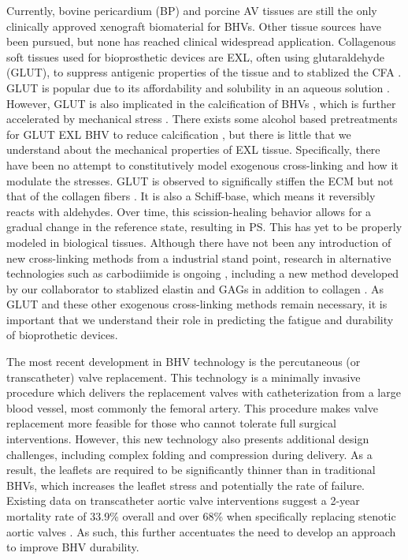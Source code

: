     
    Currently, bovine pericardium (BP) and porcine AV tissues are still the only clinically approved xenograft biomaterial for BHVs. Other tissue sources have been pursued, but none has reached clinical widespread application. Collagenous soft tissues used for bioprosthetic devices are EXL, often using glutaraldehyde (GLUT), to suppress antigenic properties of the tissue and to stablized the CFA \cite{khor_methods_1997}. GLUT is popular due to its affordability and solubility in an aqueous solution \cite{jayakrishnan_glutaraldehyde_1996}. However, GLUT is also implicated in the calcification of BHVs \cite{golomb_role_1987}, which is further accelerated by mechanical stress \cite{schoen_calcification_2005}. There exists some alcohol based pretreatments for GLUT EXL BHV to reduce calcification \cite{vyavahare_prevention_1997}, but there is little that we understand about the mechanical properties of EXL tissue. Specifically, there have been no attempt to constitutively model exogenous cross-linking and how it modulate the stresses. GLUT is observed to significally stiffen the ECM but not that of the collagen fibers \cite{gentleman_mechanical_2003,yang_mechanical_2008,yang_micromechanical_2007}. It is also a Schiff-base, which means it reversibly reacts with aldehydes. Over time, this scission-healing behavior allows for a gradual change in the reference state, resulting in PS. This has yet to be properly modeled in biological tissues. Although there have not been any introduction of new cross-linking methods from a industrial stand point, research in alternative technologies such as carbodiimide is ongoing \cite{sung_crosslinking_2003,billiar_effects_2001,kemp_effects_1995}, including a new method developed by our collaborator to stablized elastin and GAGs in addition to collagen \cite{tam_novel_2015}. As GLUT and these other exogenous cross-linking methods remain necessary, it is important that we understand their role in predicting the fatigue and durability of bioprothetic devices.
    
    
    The most recent development in BHV technology is the percutaneous (or transcatheter) valve replacement. This technology is a minimally invasive procedure which delivers the replacement valves with catheterization from a large blood vessel, most commonly the femoral artery. This procedure makes valve replacement more feasible for those who cannot tolerate full surgical interventions. However, this new technology also presents additional design challenges, including complex folding and compression during delivery. As a result, the leaflets are required to be significantly thinner than in traditional BHVs, which increases the leaflet stress and potentially the rate of failure. Existing data on transcatheter aortic valve interventions suggest a 2-year mortality rate of 33.9\% overall \cite{mozaffarian_heart_2016} and over 68\% when specifically replacing stenotic aortic valves \cite{makkar_transcatheter_2012}. As such, this further accentuates the need to develop an approach to improve BHV durability. 
    
